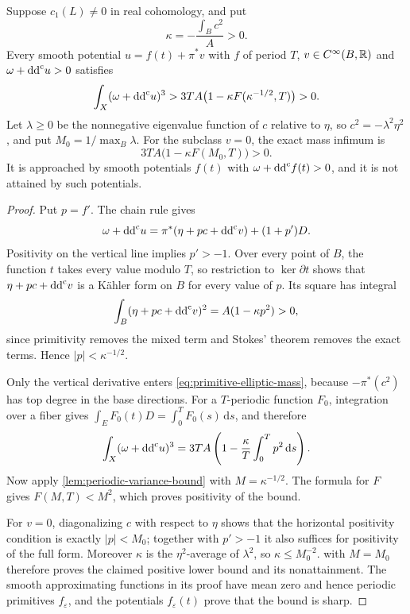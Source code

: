\begin{proposition}\label{prop:primitive-elliptic-separated}
Suppose $c_1(L)\ne0$ in real cohomology, and put
\[
 \kappa=-\frac{\int_Bc^2}{A}>0.
\]
Every smooth potential $u=f(t)+\pi^*v$ with $f$ of period $T$, $v\in C^\infty(B,\mathbb R)$ and $\omega+\mathrm{dd}^{\mathrm{c}} u>0$ satisfies
\[
 \int_X(\omega+\mathrm{dd}^{\mathrm{c}} u)^3
 >3TA\bigl(1-\kappa F(\kappa^{-1/2},T)\bigr)>0.
\]
Let $\lambda\geq0$ be the nonnegative eigenvalue function of $c$ relative to $\eta$, so $c^2=-\lambda^2\eta^2$, and put $M_0=1/\max_B\lambda$. For the subclass $v=0$, the exact mass infimum is
\[
 3TA\bigl(1-\kappa F(M_0,T)\bigr)>0.
\]
It is approached by smooth potentials $f(t)$ with $\omega+\mathrm{dd}^{\mathrm{c}} f(t)>0$, and it is not attained by such potentials.
\end{proposition}
\begin{proof}
Put $p=f'$. The chain rule gives
\[
 \omega+\mathrm{dd}^{\mathrm{c}} u
 =\pi^*(\eta+pc+\mathrm{dd}^{\mathrm{c}} v)+(1+p')D.
\]
Positivity on the vertical line implies $p'>-1$. Over every point of $B$, the function $t$ takes every value modulo $T$, so restriction to $\ker\partial t$ shows that $\eta+pc+\mathrm{dd}^{\mathrm{c}} v$ is a K\"ahler form on $B$ for every value of $p$. Its square has integral
\[
 \int_B(\eta+pc+\mathrm{dd}^{\mathrm{c}} v)^2=A(1-\kappa p^2)>0,
\]
since primitivity removes the mixed term and Stokes' theorem removes the exact terms. Hence $|p|<\kappa^{-1/2}$.

Only the vertical derivative enters \eqref{eq:primitive-elliptic-mass}, because $-\pi^*(c^2)$ has top degree in the base directions. For a $T$-periodic function $F_0$, integration over a fiber gives $\int_E F_0(t)D=\int_0^T F_0(s)\,\mathrm{d}s$, and therefore
\[
 \int_X(\omega+\mathrm{dd}^{\mathrm{c}} u)^3
 =3TA\left(1-\frac\kappa T\int_0^T p^2\,\mathrm{d}s\right).
\]
Now apply \cref{lem:periodic-variance-bound} with $M=\kappa^{-1/2}$. The formula for $F$ gives $F(M,T)<M^2$, which proves positivity of the bound.

For $v=0$, diagonalizing $c$ with respect to $\eta$ shows that the horizontal positivity condition is exactly $|p|<M_0$; together with $p'>-1$ it also suffices for positivity of the full form. Moreover $\kappa$ is the $\eta^2$-average of $\lambda^2$, so $\kappa\leq M_0^{-2}$.  with $M=M_0$ therefore proves the claimed positive lower bound and its nonattainment. The smooth approximating functions in its proof have mean zero and hence periodic primitives $f_\varepsilon$, and the potentials $f_\varepsilon(t)$ prove that the bound is sharp.
\end{proof}

